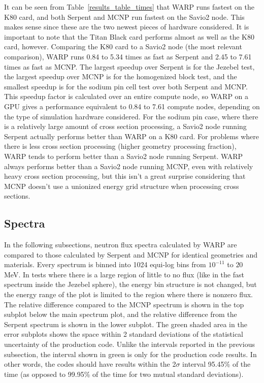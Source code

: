 \documentclass[preprint,12pt]{elsarticle}
\begin{document}
It can be seen from Table~\ref{results_table_times} that WARP runs fastest on the K80 card, and both Serpent and MCNP run fastest on the Savio2 node.  This makes sense since these are the two newest pieces of hardware considered.  It is important to note that the Titan Black card performs almost as well as the K80 card, however.  Comparing the K80 card to a Savio2 node (the most relevant comparison), WARP runs 0.84 to 5.34 times as fast as Serpent and 2.45 to 7.61 times as fast as MCNP.   The largest speedup over Serpent is for the Jezebel test, the largest speedup over MCNP is for the homogenized block test, and the smallest speedup is for the sodium pin cell test over both Serpent and MCNP.  This speedup factor is calculated over an entire compute node, so WARP on a GPU gives a performance equivalent to 0.84 to 7.61 compute nodes, depending on the type of simulation hardware considered.  For the sodium pin case, where there is a relatively large amount of cross section processing, a Savio2 node running Serpent actually performs better than WARP on a K80 card.  For problems where there is less cross section processing (higher geometry processing fraction), WARP tends to perform better than a Savio2 node running Serpent.  WARP always performs better than a Savio2 node running MCNP, even with relatively heavy cross section processing, but this isn't a great surprise considering that MCNP doesn't use a unionized energy grid structure when processing cross sections.


\subsection{Spectra}

In the following subsections, neutron flux spectra calculated by WARP are compared to those calculated by Serpent and MCNP for identical geometries and materials.  Every spectrum is binned into 1024 equi-log bins from $10^{-11}$ to $20$ MeV.  In tests where there is a large region of little to no flux (like in the fast spectrum inside the Jezebel sphere), the energy bin structure is not changed, but the energy range of the plot is limited to the region where there is nonzero flux.  The relative difference compared to the MCNP spectrum is shown in the top subplot below the main spectrum plot, and the relative difference from the Serpent spectrum is shown in the lower subplot.  The green shaded area in the error subplots shows the space within 2 standard deviations of the statistical uncertainty of the production code.  Unlike the intervals reported in the previous subsection, the interval shown in green is only for the production code results.  In other words, the codes should have results within the 2$\sigma$ interval 95.45\% of the time (as opposed to 99.95\% of the time for two mutual standard deviations).
\end{document}
